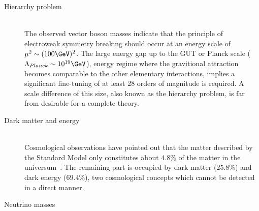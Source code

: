 \begin{myindentpar}
\begin{description}
    \item[Hierarchy problem] \hfill \\
    The observed vector boson masses indicate that the principle of electroweak symmetry breaking should occur at an energy scale of $\mu^{2} \sim (100 \GeV)^{2}$.
    The large energy gap up to the GUT or Planck scale ($\Lambda_{Planck} \sim 10^{19} \GeV$), energy regime where the gravitional attraction becomes comparable to the other elementary interactions, implies a significant fine-tuning of at least 28 orders of magnitude is required. 
    A scale difference of this size, also known as the hierarchy problem, is far from desirable for a complete theory.
    
    \item[Dark matter and energy] \hfill \\
    Cosmological observations have pointed out that the matter described by the Standard Model only constitutes about $4.8 \%$ of the matter in the universum~\cite{PlanckResults}. The remaining part is occupied by dark matter ($25.8 \%$) and dark energy ($69.4 \%$), two cosmological concepts which cannot be detected in a direct manner.
    
    
    \item[Neutrino masses] \hfill \\
    
   \end{description}
\end{myindentpar}
